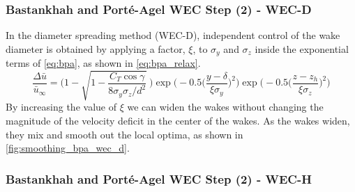 \documentclass[a4paper]{jpconf}
\begin{document}
\subsubsection{Bastankhah and Port\'e-Agel WEC Step (2) - WEC-D}
In the diameter spreading method (WEC-D), independent control of the wake diameter is obtained by applying a factor, $\xi$, to $\sigma_y$ and $\sigma_z$ inside the exponential terms of \cref{eq:bpa}, as shown in \cref{eq:bpa_relax}.
\begin{equation}
\frac{\Delta \bar{u}}{\bar{u}_{\infty}} = \Bigg(1-\sqrt{1-\frac{C_T \cos{\gamma}}{8 \sigma_y \sigma_z/d^2}}~\Bigg) \exp{\bigg(-0.5\Big(\frac{y-\delta}{\xi \sigma_y}\Big)^2\bigg)}\exp{\bigg(-0.5\Big(\frac{z-z_h}{\xi \sigma_z}\Big)^2\bigg)}
\label{eq:bpa_relax}
\end{equation}
By increasing the value of $\xi$ we can widen the wakes without changing the magnitude of the velocity deficit in the center of the wakes. As the wakes widen, they mix and smooth out the local optima, as shown in \cref{fig:smoothing_bpa_wec_d}. 

\subsubsection{Bastankhah and Port\'e-Agel WEC Step (2) - WEC-H}
\end{document}
